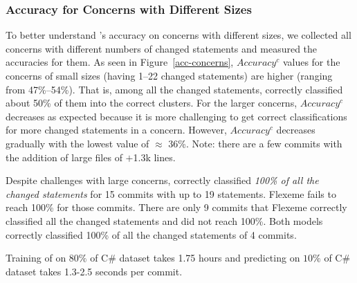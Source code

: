 

\vspace{-2pt}
\subsubsection{Accuracy for Concerns with Different Sizes}

To better understand {\tool}'s accuracy on concerns with different
sizes, we collected all concerns with different numbers of changed
statements and measured the accuracies for them.  As seen in
Figure~\ref{acc-concerns}, $Accuracy^{c}$ values for the concerns of
small sizes (having 1--22 changed statements) are higher (ranging from
47\%--54\%). That is, among all the changed statements, {\tool}
correctly classified about 50\% of them into the correct clusters.
For the larger concerns, $Accuracy^{c}$ decreases as expected because
it is more challenging to get correct classifications for more changed
statements in a concern. However, $Accuracy^{c}$ decreases gradually
with the lowest value of $\approx$ 36\%. Note: there are a few commits
with the addition of large files of $+$1.3k lines.

Despite challenges with large concerns, {\tool} correctly classified
{\em 100\% of all the changed statements} for 15 commits with up to 19
statements. Flexeme fails to reach 100\% for those commits. There are
only 9 commits that Flexeme correctly classified all the changed
statements and {\tool} did not reach 100\%. Both models correctly
classified 100\% of all the changed statements of 4 commits.

       










Training of \tool on $80\%$ of C\# dataset takes 1.75 hours and
predicting on $10\%$ of C\# dataset takes 1.3-2.5 seconds per commit.
